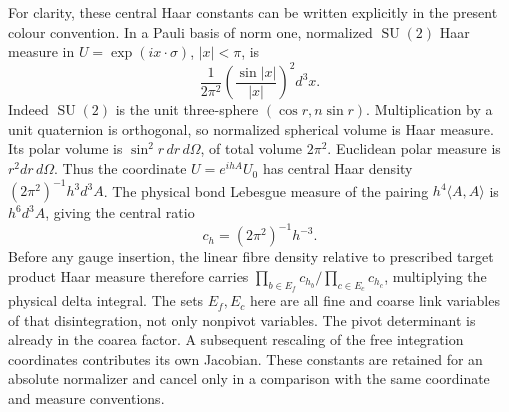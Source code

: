 \documentclass[11pt,letterpaper,reqno]{amsart}
\numberwithin{equation}{section}
\theoremstyle{definition}
\theoremstyle{remark}
\begin{document}
For clarity, these central Haar constants can be written
explicitly in the present colour convention. In a Pauli
basis of norm one, normalized $\operatorname{SU}(2)$ Haar
measure in $U=\exp(i x\cdot\sigma)$, $|x|<\pi$, is
\[
 \frac1{2\pi^2}\left(\frac{\sin|x|}{|x|}\right)^2d^3x.
\]
Indeed $\operatorname{SU}(2)$ is the unit three-sphere
$(\cos r,n\sin r)$. Multiplication by a unit quaternion
is orthogonal, so normalized spherical volume is Haar measure.
Its polar volume is
$\sin^2r\,dr\,d\Omega$, of total volume $2\pi^2$.
Euclidean polar measure is $r^2dr\,d\Omega$.
Thus the coordinate $U=e^{ih A}U_0$ has central Haar
density $(2\pi^2)^{-1}h^3d^3A$. The physical bond
Lebesgue measure of the pairing $h^4\langle A,A\rangle$
is $h^6d^3A$, giving the central ratio
\begin{equation}\label{gi:eq-central-haar-factor}
                         c_h=(2\pi^2)^{-1}h^{-3}.
\end{equation}
Before any gauge insertion, the linear fibre density
relative to prescribed target product Haar measure
therefore carries $\prod_{b\in E_f}c_{h_b}/
\prod_{c\in E_c}c_{h_c}$, multiplying the physical
delta integral. The sets $E_f,E_c$ here are all fine
and coarse link variables of that disintegration, not
only nonpivot variables. The pivot determinant is
already in the coarea factor. A subsequent rescaling
of the free integration coordinates contributes its
own Jacobian. These constants are retained for an
absolute normalizer and cancel only in a comparison
with the same coordinate and measure conventions.
\end{document}
